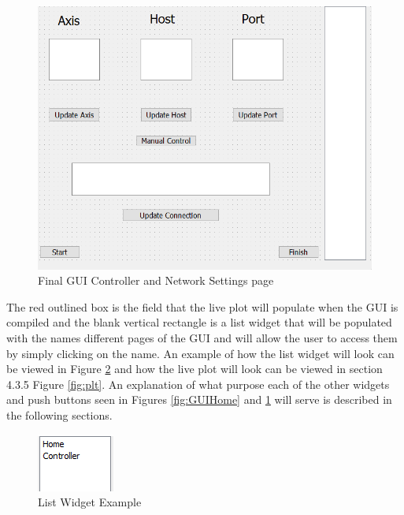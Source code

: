 \begin{figure}[H]
	\includegraphics[width=\linewidth]{Final_GUI_CTRL.png}
	\caption{Final GUI Controller and Network Settings page}
	\label{fig:GUICtrl}
\end{figure}
The red outlined box is the field that the live plot will populate when the GUI is compiled and the blank vertical rectangle is a list widget that will be populated with the names different pages of the GUI and will allow the user to access them by simply clicking on the name. An example of how the list widget will look can be viewed in Figure \ref{fig:list} and how the live plot will look can be viewed in section 4.3.5 Figure \ref{fig:plt}. An explanation of what purpose each of the other widgets and push buttons seen in Figures \ref{fig:GUIHome} and \ref{fig:GUICtrl} will serve is described in the following sections.
\begin{figure}[H]
	\centering
	\includegraphics[width=0.3\linewidth]{listWidget.png}
	\caption{List Widget Example}
	\label{fig:list}
\end{figure}
